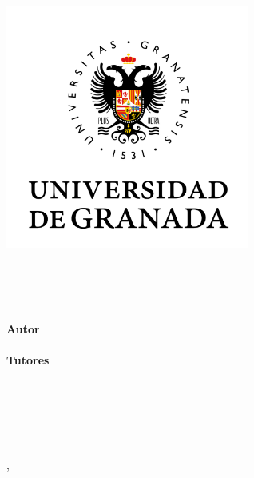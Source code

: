 \begin{titlepage}
    \begin{addmargin}[-3.45cm]{-3cm}
    \begin{center}
        \large  

        \hfill

        \includegraphics[width=8cm]{gfx/ugr_icon} \\ \medskip

        \vfill

        \begingroup
            \color{Maroon}\spacedallcaps{\myTitle} \\ \bigskip
        \endgroup

        \spacedlowsmallcaps{\mySubtitle}

        \vfill

        \myWork \\ 
        \myDegree \\ \bigskip
        \textbf{Autor} \\
        \myName \\ \medskip
        \textbf{Tutores} \\
        \myProf \\
        \myOtherProf \\ \bigskip
        \spacedlowsmallcaps{\myFaculty} \\ \medskip
        \spacedlowsmallcaps{\myOtherFacultyA} \\
        \spacedlowsmallcaps{\myOtherFacultyB} \\ \bigskip

        \myLocation, \myTime %

        \vfill                      

    \end{center}  
  \end{addmargin}       
\end{titlepage}   